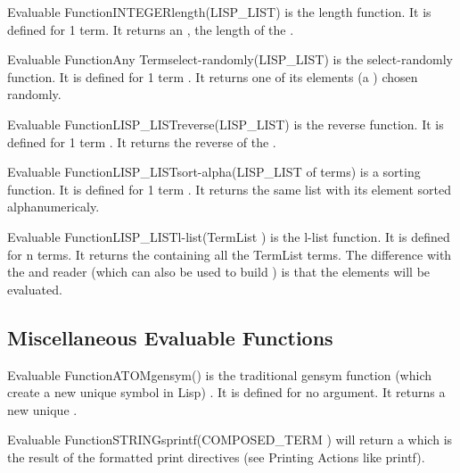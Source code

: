 \begin{typeefa}{Evaluable Function}{INTEGER}{length}{(LISP\_LIST)}
is the length function. It is defined for 1 term. It returns an ,
the length of the .
\end{typeefa}

\begin{typeefa}{Evaluable Function}{Any Term}{select-randomly}{(LISP\_LIST)}
is the select-randomly function. It is defined for 1 term . It
returns one of its elements (a ) chosen randomly.
\end{typeefa}

\begin{typeefa}{Evaluable Function}{LISP\_LIST}{reverse}{(LISP\_LIST)}
is the reverse function. It is defined for 1 term . It returns the
reverse of the .
\end{typeefa}

\begin{typeefa}{Evaluable Function}{LISP\_LIST}{sort-alpha}{(LISP\_LIST of terms)}
is a sorting function. It is defined for 1 term . It returns the
same list with its element sorted alphanumericaly.
\end{typeefa}

\begin{typeefa}{Evaluable Function}{LISP\_LIST}{l-list}{(TermList )}
is the l-list function. It is defined for n terms. It returns the
 containing all the TermList terms. The difference with the
 and  reader (which can also be used to build )
is that the elements will be evaluated.
\end{typeefa}

\subsection{Miscellaneous Evaluable Functions}

\begin{typeefa}{Evaluable Function}{ATOM}{gensym}{()}
is the traditional gensym function (which create a new unique symbol in Lisp) .
It is defined for no argument. It returns a new unique .
\end{typeefa}

\begin{typeefa}{Evaluable Function}{STRING}{sprintf}{(COMPOSED\_TERM )}
will return a  which is the result of the formatted print directives (see Printing Actions like printf).
\end{typeefa}

